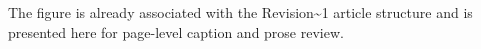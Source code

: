 The figure is already associated with the Revision\textasciitilde{}1 article structure and is presented here for page-level caption and prose review.
